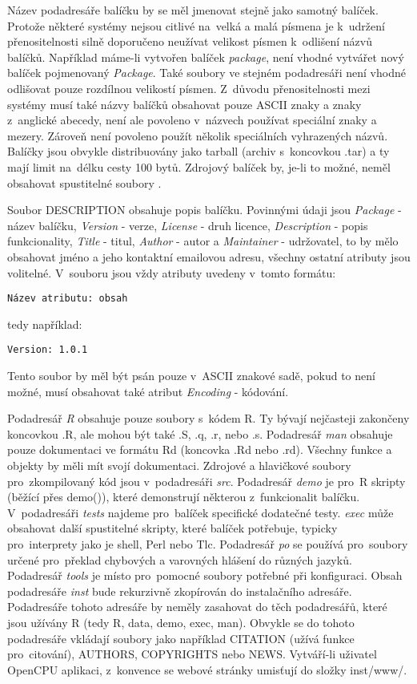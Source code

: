 \documentclass[thesis=B,czech]{FITthesis}[2012/06/26]
\begin{document}
Název podadresáře balíčku by se měl jmenovat stejně jako samotný balíček. Protože některé systémy nejsou citlivé na~velká a malá písmena je k~udržení přenositelnosti silně doporučeno neužívat velikost písmen k~odlišení názvů balíčků. Například máme-li vytvořen balíček \textit{package}, není vhodné vytvářet nový balíček pojmenovaný \textit{Package}. Také soubory ve stejném podadresáři není vhodné odlišovat pouze rozdílnou velikostí písmen. Z~důvodu přenositelnosti mezi systémy musí také názvy balíčků obsahovat pouze ASCII znaky a znaky z~anglické abecedy, není ale povoleno v~názvech používat speciální znaky a mezery. Zároveň není povoleno použít několik speciálních vyhrazených názvů. Balíčky jsou obvykle distribuovány jako tarball (archiv s~koncovkou .tar) a ty mají limit na~délku cesty 100 bytů. Zdrojový balíček by, je-li to možné, neměl obsahovat spustitelné soubory \cite{RPackageWriting}.

Soubor DESCRIPTION obsahuje popis balíčku. Povinnými údaji jsou \textit{Package} - název balíčku, \textit{Version} - verze, \textit{License} - druh licence, \textit{Description} - popis funkcionality, \textit{Title} - titul, \textit{Author} - autor a \textit{Maintainer} - udržovatel, to by mělo obsahovat jméno a jeho kontaktní emailovou adresu, všechny ostatní atributy jsou volitelné. V~souboru jsou vždy atributy uvedeny v~tomto formátu: 
\begin{verbatim}
Název atributu: obsah
\end{verbatim}
tedy například:
\begin{verbatim}
Version: 1.0.1
\end{verbatim}
Tento soubor by měl být psán pouze v~ASCII znakové sadě, pokud to není možné, musí obsahovat také atribut \textit{Encoding} - kódování.

Podadresář \textit{R} obsahuje pouze soubory s~kódem R. Ty bývají nejčasteji zakončeny koncovkou .R, ale mohou být také .S, .q, .r, nebo .s. Podadresář \textit{man} obsahuje pouze dokumentaci ve formátu Rd (koncovka .Rd nebo .rd). Všechny funkce a objekty by měli mít svojí dokumentaci. Zdrojové a hlavičkové soubory pro~zkompilovaný kód jsou v~podadresáři \textit{src}. Podadresář \textit{demo} je pro~R skripty (běžící přes demo()), které demonstrují některou z~funkcionalit balíčku. V~podadresáři \textit{tests} najdeme pro~balíček specifické dodatečné testy. \textit{exec} může obsahovat další spustitelné skripty, které balíček potřebuje, typicky pro~interprety jako je shell, Perl nebo Tlc. Podadresář \textit{po} se používá pro~soubory určené pro~překlad chybových a varovných hlášení do různých jazyků. Podadresář \textit{tools} je místo pro~pomocné soubory potřebné při konfiguraci. Obsah podadresáře \textit{inst} bude rekurzivně zkopírován do instalačního adresáře. Podadresáře tohoto adresáře by neměly zasahovat do těch podadresářů, které jsou užívány R (tedy R, data, demo, exec, man). Obvykle se do tohoto podadresáře vkládají soubory jako například CITATION (užívá funkce pro~citování), AUTHORS, COPYRIGHTS nebo NEWS. Vytváří-li uživatel OpenCPU aplikaci, z~konvence se webové stránky umisťují do složky inst/www/. 
\end{document}
